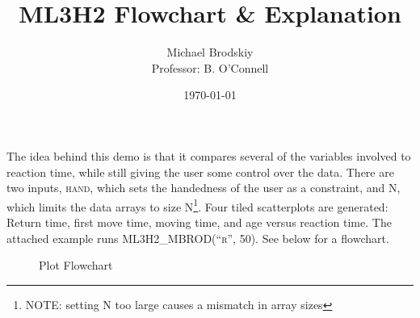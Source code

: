 


\title{ML3H2 Flowchart \& Explanation}
\date{\today}
\author{Michael Brodskiy\\ \small Professor: B. O'Connell}



\maketitle

\begin{justify}

  The idea behind this demo is that it compares several of the variables involved to reaction time, while still giving the user some control over the data. There are two inputs, \textsc{hand}, which sets the handedness of the user as a constraint, and \textsc{N}, which limits the data arrays to size \textsc{N}\footnote{NOTE: setting \textsc{N} too large causes a mismatch in array sizes}. Four tiled scatterplots are generated: Return time, first move time, moving time, and age versus reaction time. The attached example runs \textsc{ML3H2\_MBROD(``r'', 50)}. See below for a flowchart.
\end{justify}

\begin{figure}[H]
  \centering
  
  \caption{Plot Flowchart}
  \label{fig:1}
\end{figure}



